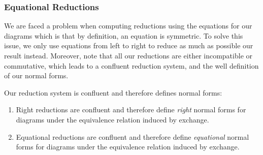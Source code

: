 \subsubsection{Equational Reductions}
We are faced a problem when computing reductions using the equations for our diagrams
which is that by definition, an equation is symmetric.
To solve this issue, we only use equations from left to right to reduce as much as
possible our result instead.
Moreover, note that all our reductions are either incompatible or commutative, which
leads to a confluent reduction system, and the well definition of our normal forms.
\begin{theorem}[Confluence]
	\label{thm:confluence}
	Our reduction system is confluent and therefore defines normal forms:
	\begin{enumerate}
		\item Right reductions are confluent and therefore define \emph{right} normal forms for
		      diagrams under the equivalence relation induced by exchange.
		\item Equational reductions are confluent and therefore define \emph{equational}
		      normal forms for diagrams under the equivalence relation induced by exchange.
	\end{enumerate}
\end{theorem}

